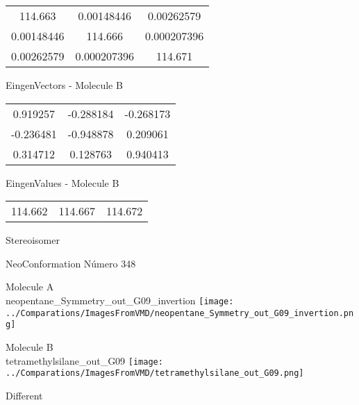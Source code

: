 \begin{multicols}{2}
\begin{center}
\begin{tabular}{|c c c|}
114.663	 & 	0.00148446	 & 	0.00262579	 \\
0.00148446	 & 	114.666	 & 	0.000207396	 \\
0.00262579	 & 	0.000207396	 & 	114.671
\end{tabular}

\vtab
 EingenVectors - Molecule B     \\
\vtab
\begin{tabular}{|c c c|}
0.919257	 & 	-0.288184	 & 	-0.268173	 \\
-0.236481	 & 	-0.948878	 & 	0.209061	 \\
0.314712	 & 	0.128763	 & 	0.940413
\end{tabular}

\vtab
 EingenValues - Molecule B     \\
\vtab
\begin{tabular}{|c c c|}
114.662	 & 	114.667	 & 	114.672	 \\
\end{tabular}

\end{center}
\end{multicols}
\begin{center}
\vtab
\vtab
\textcolor{NavyBlue}{\Large Stereoisomer}
\end{center}

 \newpage

\vtab[-2cm]
\begin{center}
{\large NeoConformation \tab Número 348}
\end{center}
\begin{multicols}{2}
\begin{center}
Molecule A \\ 
neopentane\_Symmetry\_out\_G09\_invertion
\texttt{[image: ../Comparations/ImagesFromVMD/neopentane\_Symmetry\_out\_G09\_invertion.png]}
\\
\vtab

\columnbreak
Molecule B \\ 
tetramethylsilane\_out\_G09
\texttt{[image: ../Comparations/ImagesFromVMD/tetramethylsilane\_out\_G09.png]}
\\
\vtab


\end{center}
\end{multicols}
\begin{center}
\vtab
\vtab
\textcolor{NavyBlue}{\Large Different}
\end{center}

